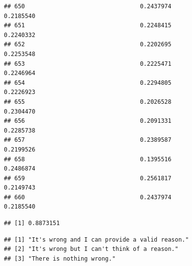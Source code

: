 \documentclass[
  american,
  man,floatsintext]{apa7}
\begin{document}
\begin{verbatim}
## 650                                 0.2437974               0.2185540
## 651                                 0.2248415               0.2240332
## 652                                 0.2202695               0.2253548
## 653                                 0.2225471               0.2246964
## 654                                 0.2294805               0.2226923
## 655                                 0.2026528               0.2304470
## 656                                 0.2091331               0.2285738
## 657                                 0.2389587               0.2199526
## 658                                 0.1395516               0.2486874
## 659                                 0.2561817               0.2149743
## 660                                 0.2437974               0.2185540
\end{verbatim}

\begin{verbatim}
## [1] 0.8873151
\end{verbatim}

\begin{verbatim}
## [1] "It's wrong and I can provide a valid reason."
## [2] "It's wrong but I can't think of a reason."   
## [3] "There is nothing wrong."
\end{verbatim}
\end{document}
